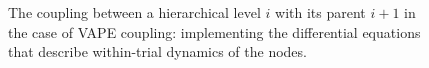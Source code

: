 \begin{figure}
  \centering

  \small

  \newcommand{\w}[1]{\textcolor{white}{#1}}
  \def\svgwidth{0.9\textwidth}


  \caption{The coupling between a hierarchical level $i$ with its parent $i+1$ in the case of \textsf{VAPE} coupling: implementing the differential equations that describe within-trial dynamics of the nodes.}
  \label{\figlabel}
\end{figure}
